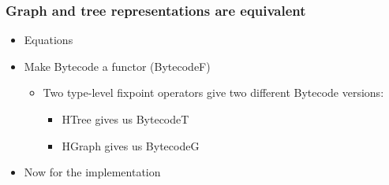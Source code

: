         \begin{frame}
            \frametitle{Graph and tree representations are equivalent}

            \begin{itemize}
                \item Equations
                \item Make Bytecode a functor (BytecodeF)
                    \begin{itemize}
                        \item Two type-level fixpoint operators give two different Bytecode versions:
                        \begin{itemize}
                            \item HTree gives us BytecodeT
                            \item HGraph gives us BytecodeG
                        \end{itemize}
                    \end{itemize}

                \item Now for the implementation
            \end{itemize}
        \end{frame}


